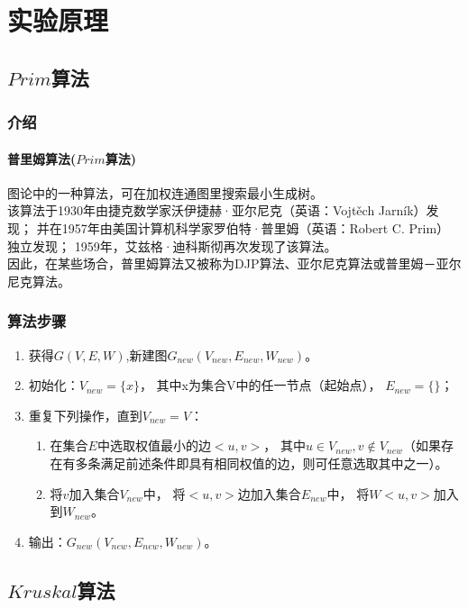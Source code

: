 \documentclass[a4paper,10pt]{ctexart}
\begin{document}
\section{实验原理}
\subsection{$Prim$算法}
\subsubsection{介绍}
\paragraph{普里姆算法($Prim$算法)}
图论中的一种算法，可在加权连通图里搜索最小生成树。\\
该算法于1930年由捷克数学家沃伊捷赫·亚尔尼克（英语：Vojtěch Jarník）发现；
并在1957年由美国计算机科学家罗伯特·普里姆（英语：Robert C. Prim）独立发现；
1959年，艾兹格·迪科斯彻再次发现了该算法。\\
因此，在某些场合，普里姆算法又被称为DJP算法、亚尔尼克算法或普里姆－亚尔尼克算法。

\subsubsection{算法步骤}
\begin{enumerate}
  \item 获得$G(V,E,W)$,新建图$G_{new}(V_{new},E_{new},W_{new})$。
  \item 初始化：$V_{new} = \{x\}$，
        其中x为集合V中的任一节点（起始点），
        $E_{new} = \{ \} $；
  \item 重复下列操作，直到$V_{new} = V$：
    \begin{enumerate}
        \item 在集合$E$中选取权值最小的边$<u, v>$，
        其中$u\in V_{new},v \not\in V_ {new}$（如果存在有多条满足前述条件即具有相同权值的边，则可任意选取其中之一）。
        \item   将$v$加入集合$V_{new}$中，
                将$<u,v>$边加入集合$E_{new}$中，
                将$W<u,v>$加入到$W_{new}$。
  \end{enumerate}
  \item 输出：$G_{new}(V_{new},E_{new},W_{new})$。
\end{enumerate}

\subsection{$Kruskal$算法}
\end{document}
